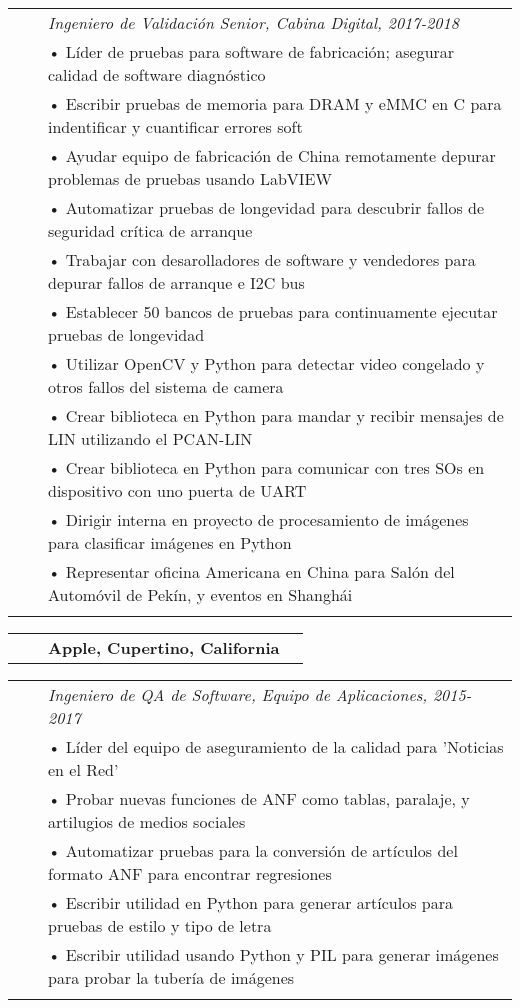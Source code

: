 \documentclass{minimal}
\begin{document}
\begin{tabular}{ p{1.5cm} p{1cm} p{16cm} }
& & \textit{Ingeniero de Validación Senior, Cabina Digital, 2017-2018}\\
& & • Líder de pruebas para software de fabricación; asegurar calidad de software diagnóstico\\
& & • Escribir pruebas de memoria para DRAM y eMMC en C para indentificar y cuantificar errores soft\\
& & • Ayudar equipo de fabricación de China remotamente depurar problemas de pruebas usando LabVIEW\\
& & • Automatizar pruebas de longevidad para descubrir fallos de seguridad crítica de arranque\\
& & • Trabajar con desarolladores de software y vendedores para depurar fallos de arranque e I2C bus\\
& & • Establecer 50 bancos de pruebas para continuamente ejecutar pruebas de longevidad\\
& & • Utilizar OpenCV y Python para detectar video congelado y otros fallos del sistema de camera\\
& & • Crear biblioteca en Python para mandar y recibir mensajes de LIN utilizando el PCAN-LIN\\
& & • Crear biblioteca en Python para comunicar con tres SOs en dispositivo con uno puerta de UART\\
& & • Dirigir interna en proyecto de procesamiento de imágenes para clasificar imágenes en Python\\
& & • Representar oficina Americana en China para Salón del Automóvil de Pekín, y eventos en Shanghái\\
& & \\
\end{tabular}

\begin{tabular}{ p{1.5cm} p{1cm} p{10cm} >{\raggedleft\arraybackslash}p{3cm} }
& & \textbf{Apple, Cupertino, California} & \\
\end{tabular}

\begin{tabular}{ p{1.5cm} p{1cm} p{16cm} }
& & \textit{Ingeniero de QA de Software, Equipo de Aplicaciones, 2015-2017}\\
& & • Líder del equipo de aseguramiento de la calidad para 'Noticias en el Red'\\
& & • Probar nuevas funciones de ANF como tablas, paralaje, y artilugios de medios sociales\\
& & • Automatizar pruebas para la conversión de artículos del formato ANF para encontrar regresiones\\ 
& & • Escribir utilidad en Python para generar artículos para pruebas de estilo y tipo de letra\\
& & • Escribir utilidad usando Python y PIL para generar imágenes para probar la tubería de imágenes\\
& & \\
\end{tabular}
\end{document}
